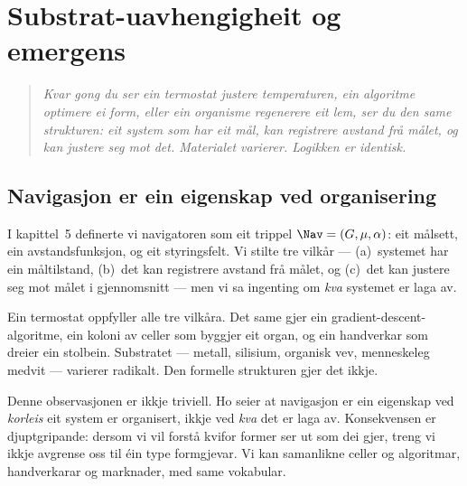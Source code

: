 

\chapter{Substrat-uavhengigheit og emergens}
\label{chap:substrat}

\begin{quote}
\itshape
Kvar gong du ser ein termostat justere temperaturen, ein algoritme
optimere ei form, eller ein organisme regenerere eit lem, ser du
den same strukturen: eit system som har eit mål, kan registrere
avstand frå målet, og kan justere seg mot det. Materialet varierer.
Logikken er identisk.
\end{quote}

\section{Navigasjon er ein eigenskap ved organisering}

I kapittel~5 definerte vi navigatoren som eit trippel
$\Nav = (G, \mu, \alpha)$: eit målsett, ein avstandsfunksjon,
og eit styringsfelt. Vi stilte tre vilkår --- (a)~systemet har ein
måltilstand, (b)~det kan registrere avstand frå målet, og (c)~det
kan justere seg mot målet i gjennomsnitt --- men vi sa ingenting
om \emph{kva} systemet er laga av.

Ein termostat oppfyller alle tre vilkåra. Det same gjer ein
gradient-descent-algoritme, ein koloni av celler som byggjer eit
organ, og ein handverkar som dreier ein stolbein. Substratet --- metall,
silisium, organisk vev, menneskeleg medvit --- varierer radikalt.
Den formelle strukturen gjer det ikkje.

Denne observasjonen er ikkje triviell. Ho seier at navigasjon er
ein eigenskap ved \emph{korleis} eit system er organisert, ikkje
ved \emph{kva} det er laga av. Konsekvensen er djuptgripande:
dersom vi vil forstå kvifor former ser ut som dei gjer, treng vi
ikkje avgrense oss til éin type formgjevar. Vi kan samanlikne
celler og algoritmar, handverkarar og marknader, med same
vokabular.


